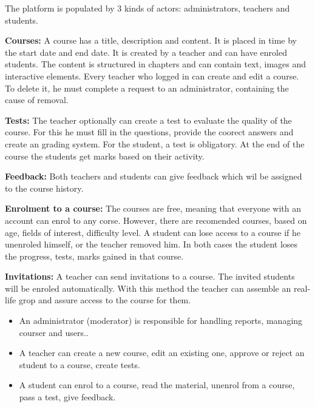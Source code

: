 \documentclass[12pt,a4paper,titlepage]{article}
\begin{document}
The platform is populated by 3 kinds of actors: administrators, teachers and students.

\textbf{Courses:}
A course has a title, description and content. It is placed in time by the start date and end date. It is created by a teacher and can have enroled students.
The content is structured in chapters and can contain text, images and interactive elements.
Every teacher who logged in can create and edit a course. To delete it, he must complete a request to an administrator, containing the cause of removal.

\textbf{Tests:}
The teacher optionally can create a test to evaluate the quality of the course. For this he must fill in the questions, provide the coorect answers and create an grading system.
For the student, a test is obligatory. At the end of the course the students get marks based on their activity.

\textbf{Feedback:}
Both teachers and students can give feedback which wil be assigned to the course history.

\textbf{Enrolment to a course:}
The courses are free, meaning that everyone with an account can enrol to any corse. However, there are recomended courses, based on age, fields of interest, difficulty level.
A student can lose access to a course if he unenroled himself, or the teacher removed him.
In both cases the student loses the progress, tests, marks gained in that course.

\textbf{Invitations:}
A teacher can send invitations to a course. The invited students will be enroled automatically. With this method the teacher can assemble an real-life grop and assure access to the course for them.

\begin{itemize}
	\item
	An administrator (moderator) is responsible for handling reports, managing courser and users..
	\item 
	A teacher can create a new course, edit an existing one, approve or reject an student to a course, create tests.
	\item
	A student can enrol to a course, read the material, unenrol from a course, pass a test, give feedback.
\end{itemize}
\end{document}
